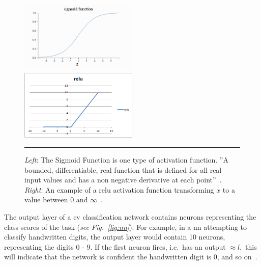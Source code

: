 \begin{figure}[H]
    \includegraphics[width=0.5\textwidth]{media/literature/sigmoid.png}
    \includegraphics[width=0.5\textwidth]{media/literature/relu.png}
    \rule{35em}{0.5pt}
    \caption[Examples of Activation Functions]{\textit{Left}: The Sigmoid Function is one type of activation function. ''A bounded, differentiable, real function that is defined for all real input values and has a non negative derivative at each point''~\citep{Han1995}. \textit{Right}: An example of a \Gls{relu} activation function transforming $x$ to a value between $0 \text{ and } \infty$~\citep{Malik2019activation}.}\label{fig:activation}
\end{figure}


The output layer of a \gls{cv} classification network contains neurons representing the class
scores of the task (\textit{see Fig.~\ref{fig:nn}}). For example, in a \gls{nn} attempting to classify handwritten
digits, the output layer would contain 10 neurons, representing the digits 0 - 9.
If the first neuron fires, i.e.\ has an output $\approx l,$ this will indicate that the
network is confident the handwritten digit is 0, and so on~\citep{Nielsen2015}.


